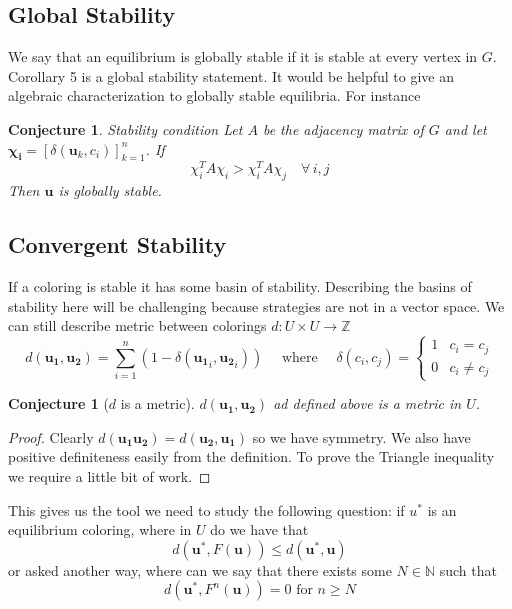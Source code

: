 \documentclass[]{article}
\newtheorem{conjecture}[theorem]{Conjecture}
\begin{document}
\subsection{Global Stability}
We say that an equilibrium is globally stable if it is stable at every vertex in $G$. Corollary 5 is a global stability statement. It would be helpful to give an algebraic characterization to globally stable equilibria. For instance

\begin{conjecture}{Stability condition}
		Let $A$ be the adjacency matrix of $G$ and let $\mathbf{\chi_i} = [\delta(\mathbf{u}_k,c_i)]_{k=1}^n$. If \begin{equation}
			\chi_i^TA\chi_i>\chi_i^TA\chi_j\quad \forall \, i, j
		\end{equation}
		Then $\mathbf{u}$ is globally stable. 
	
\end{conjecture}
\subsection{Convergent Stability}
If a coloring is stable it has some basin of stability. Describing the basins of stability here will be challenging because strategies are not in a vector space. We can still describe metric between colorings $d:U\times U \rightarrow \mathbb{Z}$
\begin{equation}
	d(\mathbf{u_1},\mathbf{u_2})=\sum_{i=1}^n (1-\delta(\mathbf{u_1}_i,\mathbf{u_2}_i)) \quad \text{ where }\quad  \delta(c_i,c_j)=\begin{cases}
		1 & c_i=c_j\\
		0 & c_i\neq c_j
	\end{cases}
\end{equation}

\begin{conjecture}[$d$ is a metric]
	$d(\mathbf{u_1},\mathbf{u_2})$ ad defined above is a metric in $U$. 
\end{conjecture}

\begin{proof}
	Clearly $d(\mathbf{u_1}\mathbf{u_2})=d(\mathbf{u_2},\mathbf{u_1})$ so we have symmetry. We also have positive definiteness easily from the definition. To prove the Triangle inequality we require a little bit of work. 
\end{proof}

This gives us the tool we need to study the following question: if $u^*$ is an equilibrium coloring, where in $U$ do we have that 
\begin{equation}
	d(\mathbf{u^*},F(\mathbf{u}))\leq d(\mathbf{u^*},\mathbf{u})
\end{equation}
or asked another way, where can we say that there exists some $N\in \mathbb{N}$ such that 
\begin{equation}
	d(\mathbf{u^*},F^n(\mathbf{u}))=0 \text{ for } n\geq N
\end{equation}
\end{document}
